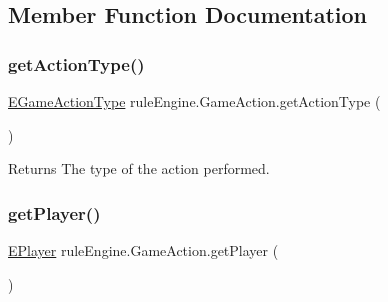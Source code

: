 \subsection{Member Function Documentation}
\mbox{\label{classrule_engine_1_1_game_action_a2d0b79903ec9cee2d06bf21ccd024d92}} 
\subsubsection{\texorpdfstring{get\+Action\+Type()}{getActionType()}}
{\footnotesize\ttfamily \mbox{\hyperlink{enumrule_engine_1_1_e_game_action_type}{E\+Game\+Action\+Type}} rule\+Engine.\+Game\+Action.\+get\+Action\+Type (\begin{DoxyParamCaption}{ }\end{DoxyParamCaption})\hspace{0.3cm}{\ttfamily [inline]}}

\begin{DoxyReturn}{Returns}
The type of the action performed. 
\end{DoxyReturn}
\mbox{\label{classrule_engine_1_1_game_action_acd7a1a123d274d486d2696ef56df0f01}} 
\subsubsection{\texorpdfstring{get\+Player()}{getPlayer()}}
{\footnotesize\ttfamily \mbox{\hyperlink{enumgame_1_1_e_player}{E\+Player}} rule\+Engine.\+Game\+Action.\+get\+Player (\begin{DoxyParamCaption}{ }\end{DoxyParamCaption})\hspace{0.3cm}{\ttfamily [inline]}}

